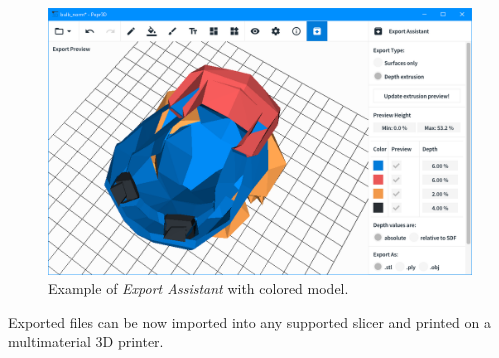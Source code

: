 \begin{figure}
	\centering
	\includegraphics[scale=0.5]{images/bulb_export.png}
	\caption{Example of \textit{Export Assistant} with colored model.}
	\label{fig:bulb_export}
\end{figure}


Exported files can be now imported into any supported slicer and printed on a multimaterial 3D printer.




